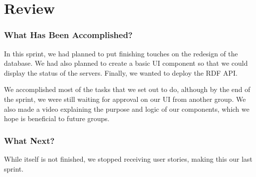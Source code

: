 \section{Review}\label{sec:sprint6review}

\subsubsection*{What Has Been Accomplished?}
In this sprint, we had planned to put finishing touches on the redesign of the database. We had also planned to create a basic UI component so that we could display the status of the servers. Finally, we wanted to deploy the RDF API.

We accomplished most of the tasks that we set out to do, although by the end of the sprint, we were still waiting for approval on our UI from another group. We also made a video explaining the purpose and logic of our components, which we hope is beneficial to future \knox{} groups.

\subsubsection*{What Next?}
While \knox{} itself is not finished, we stopped receiving user stories, making this our last sprint. 